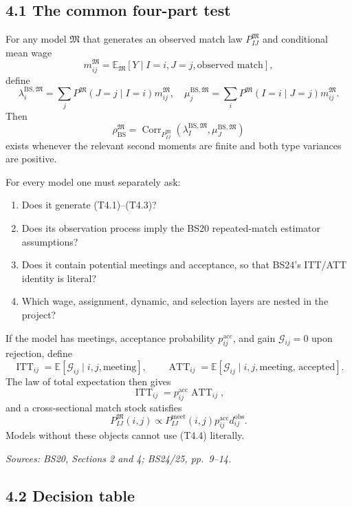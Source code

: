 \documentclass[11pt]{article}
\begin{document}
\subsection{4.1 The common four-part test}

For any model \(\mathfrak M\) that generates an observed match law
\(P^{\mathfrak M}_{IJ}\) and conditional mean wage
\[
m^{\mathfrak M}_{ij}
=
\mathbb E_{\mathfrak M}[Y\mid I=i,J=j,\text{observed match}],
\tag{T4.1}
\]
define
\[
\lambda_i^{\mathrm{BS},\mathfrak M}
=
\sum_jP^{\mathfrak M}(J=j\mid I=i)m^{\mathfrak M}_{ij},
\quad
\mu_j^{\mathrm{BS},\mathfrak M}
=
\sum_iP^{\mathfrak M}(I=i\mid J=j)m^{\mathfrak M}_{ij}.
\tag{T4.2}
\]
Then
\[
\rho_{\mathrm{BS}}^{\mathfrak M}
=
\operatorname{Corr}_{P^{\mathfrak M}_{IJ}}
(\lambda_I^{\mathrm{BS},\mathfrak M},
\mu_J^{\mathrm{BS},\mathfrak M})
\tag{T4.3}
\]
exists whenever the relevant second moments are finite and both type
variances are positive.

For every model one must separately ask:

\begin{enumerate}
\item Does it generate (T4.1)--(T4.3)?
\item Does its observation process imply the BS20 repeated-match estimator
  assumptions?
\item Does it contain potential meetings and acceptance, so that BS24's
  ITT/ATT identity is literal?
\item Which wage, assignment, dynamic, and selection layers are nested in the
  project?
\end{enumerate}

If the model has meetings, acceptance probability
\(p^{\mathrm{acc}}_{ij}\), and gain
\(\mathcal G_{ij}=0\) upon rejection, define
\[
\operatorname{ITT}_{ij}
=\mathbb E[\mathcal G_{ij}\mid i,j,\text{meeting}],
\qquad
\operatorname{ATT}_{ij}
=\mathbb E[\mathcal G_{ij}\mid i,j,\text{meeting, accepted}].
\tag{T4.3a}
\]
The law of total expectation then gives
\[
\operatorname{ITT}_{ij}
=
p^{\mathrm{acc}}_{ij}\operatorname{ATT}_{ij},
\tag{T4.4}
\]
and a cross-sectional match stock satisfies
\[
P^{\mathfrak M}_{IJ}(i,j)
\propto
P^{\mathrm{meet}}_{IJ}(i,j)
p^{\mathrm{acc}}_{ij}d_{ij}^{\mathrm{obs}}.
\tag{T4.5}
\]
Models without these objects cannot use (T4.4) literally.

\textit{Sources: BS20, Sections 2 and 4; BS24/25, pp.\ 9--14.}

\subsection{4.2 Decision table}
\end{document}
